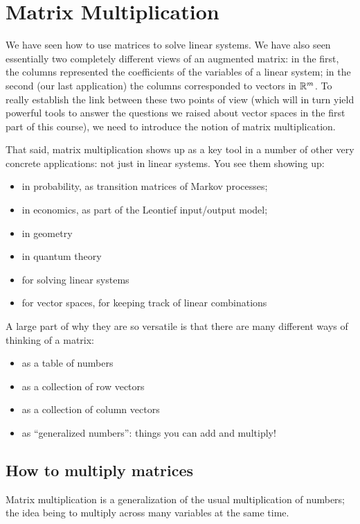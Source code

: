 \chapter{Matrix Multiplication}
\label{chapter:14matrixmult}
  

We have seen how to use matrices to solve linear systems.  We have
also seen essentially two completely different views of an augmented
matrix:  in the first, the columns represented the coefficients
of the variables of a linear system; in the second (our last application)
the columns corresponded to vectors in $\mathbb{R}^m$.  To really establish
the link between these two points of view (which will in turn
yield powerful tools to answer the questions we raised about
vector spaces in the first part of this course), we need to 
introduce the notion of matrix multiplication.    

That said, matrix multiplication shows up as a key tool in a 
number of other very concrete applications: not just in linear systems.  You see them showing up:
\begin{itemize}
\item in probability, as transition matrices of Markov processes;
\item in economics, as part of the Leontief input/output model;
\item in geometry
\item in quantum theory
\item for solving linear systems
\item for vector spaces, for keeping track of linear combinations
\end{itemize}
A large part of why they are so versatile is that there are many
different ways of thinking of a matrix:
\begin{itemize}
\item as a table of numbers
\item as a collection of row vectors
\item as a collection of column vectors
\item as ``generalized numbers'': things you can add and multiply!
\end{itemize}

\section{How to multiply matrices}

Matrix multiplication is a generalization of the usual multiplication
of numbers; the idea being to multiply across many variables at the
same time.  

